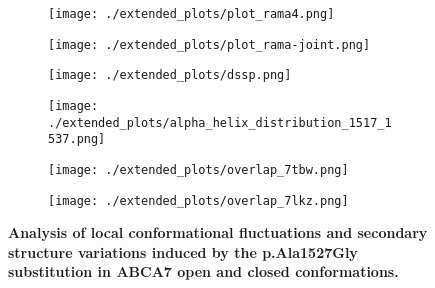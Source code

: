 \begin{figure}[H]
    \begin{subfigure}[t]{.6\textwidth}
        \caption{}
        \texttt{[image: ./extended\_plots/plot\_rama4.png]}        
    \end{subfigure}
    \begin{subfigure}[t]{.4\textwidth}
        \caption{}
        \texttt{[image: ./extended\_plots/plot\_rama-joint.png]}        
    \end{subfigure}
    \begin{subfigure}[t]{.5\textwidth}
        \caption{}
        \texttt{[image: ./extended\_plots/dssp.png]}        
    \end{subfigure}
    \begin{subfigure}[t]{.45\textwidth}
        \caption{}
        \texttt{[image: ./extended\_plots/alpha\_helix\_distribution\_1517\_1537.png]}        
    \end{subfigure}
    \begin{subfigure}[t]{.45\textwidth}
        \caption{}
        \texttt{[image: ./extended\_plots/overlap\_7tbw.png]}        
    \end{subfigure}
    \begin{subfigure}[t]{.45\textwidth}
        \caption{}
        \texttt{[image: ./extended\_plots/overlap\_7lkz.png]}        
    \end{subfigure}
    \caption{
        \textbf{Analysis of local conformational fluctuations and secondary structure variations induced by the p.Ala1527Gly substitution in ABCA7 open and closed conformations.}\\
        }
        \label{fig:md_simulations_2}
    \end{figure}
